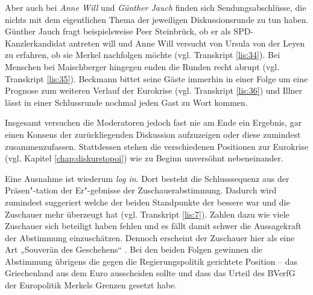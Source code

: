 Aber auch bei \textit{Anne Will} und \textit{Günther Jauch} finden sich Sendungsabschlüsse, die nichts mit dem eigentlichen Thema der jeweiligen Diskussionsrunde zu tun haben. Günther Jauch fragt beispielsweise Peer Steinbrück, ob er als SPD-Kanzlerkandidat antreten will  und Anne Will versucht von Ursula von der Leyen zu erfahren, ob sie Merkel nachfolgen möchte (vgl. Transkript \vref{lis:34}). Bei Menschen bei Maischberger hingegen enden die Runden recht abrupt (vgl. Transkript \vref{lis:35}). Beckmann bittet seine Gäste immerhin in einer Folge um eine Prognose zum weiteren Verlauf der Eurokrise (vgl. Transkript \vref{lis:36}) und Illner lässt in einer Schlussrunde nochmal jeden Gast zu Wort kommen.

Insgesamt versuchen die Moderatoren jedoch fast nie am Ende ein Ergebnis, gar einen Konsens der zurückliegenden Diskussion aufzuzeigen oder diese zumindest zusammenzufassen. Stattdessen stehen die verschiedenen Positionen zur Eurokrise (vgl. Kapitel \vref{chap:diskurstopoi}) wie zu Beginn unversöhnt nebeneinander.

Eine Ausnahme ist wiederum \textit{log in}. Dort besteht die Schlusssequenz aus der Präsen"-tation der Er"-gebnisse der Zuschauerabstimmung. Dadurch wird zumindest suggeriert welche der beiden Standpunkte der bessere war und die Zuschauer mehr überzeugt hat (vgl. Transkript \vref{lis:7}). Zahlen dazu wie viele Zuschauer sich beteiligt haben fehlen und es fällt damit schwer die Aussagekraft der Abstimmung einzuschätzen. Dennoch erscheint der Zuschauer hier als eine Art „Souverän des Geschehens“ \parencite[153]{doernerPolitainmentPolitikMedialen2001}. Bei den beiden Folgen gewinnen die Abstimmung übrigens die gegen die Regierungspolitik gerichtete Position – das Griechenland aus dem Euro ausscheiden sollte und dass das Urteil des BVerfG der Europolitik Merkels Grenzen gesetzt habe.

